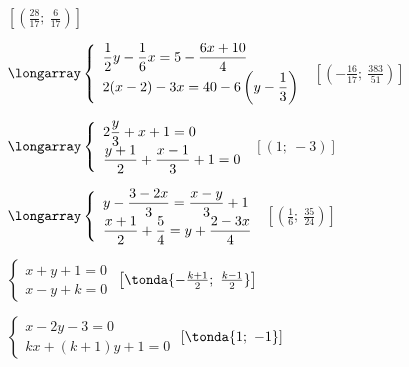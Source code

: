 \begin{esercizio}[\Ast]
\begin{multicols}{2}
\begin{enumeratea}
 \hfill \(\left[\left(\frac{28}{17};~\frac{6}{17}\right)\right]\)
\item \(\longarray\left\{\begin{array}{l}
\dfrac{1}{2}y-\dfrac{1}{6}x=5-\dfrac{6x+10}{4}\\
2(x-2)-3x=40-6\left(y-\dfrac{1}{3}\right)\end{array}\right.\)
 \hfill \(\left[\left(-\frac{16}{17};~\frac{383}{51}\right)\right]\)
\item \(\longarray\left\{\begin{array}{l}
2\dfrac{y}{3}+x+1=0\\
\dfrac{y+1}{2}+\dfrac{x-1}{3}+1=0\end{array}\right.\)
 \hfill \(\left[(1;~-3)\right]\)
\item \(\longarray\left\{\begin{array}{l}
y-\dfrac{3-2x}{3}=\dfrac{x-y}{3}+1\\
\dfrac{x+1}{2}+\dfrac{5}{4}=y+\dfrac{2-3x}{4}\end{array}\right.\)
 \hfill \(\left[\left(\frac{1}{6};~\frac{35}{24}\right)\right]\)
  \item \(\left\{\begin{array}{l}
  x+y+1=0 \\
  x-y+k=0 \end{array}\right.\)
 \hfill \(\left[\tonda{-\frac{k+1}{2};~\frac{k-1}{2}}\right]\)
\item \(\left\{\begin{array}{l}
x-2y-3=0\\
kx+(k+1)y+1=0 \end{array}\right.\)
 \hfill \(\left[\tonda{1;~-1}\right]\)
 \end{enumeratea}
 \end{multicols}
\end{esercizio}


